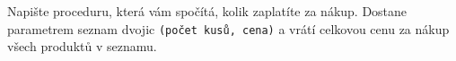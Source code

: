 \question[50]
Napište proceduru, která vám spočítá, kolik zaplatíte za nákup. Dostane
parametrem seznam dvojic \texttt{(počet kusů, cena)} a vrátí celkovou cenu za
nákup všech produktů v seznamu.